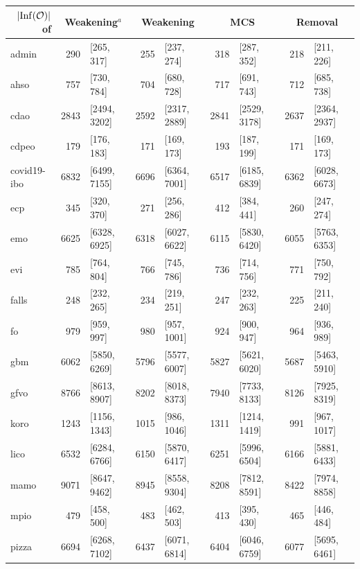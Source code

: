 \begin{table}[ht]
  \scriptsize
  \centering
  \begin{tabular}{|l|r@{ }lr@{ }lr@{ }lr@{ }l|}
    \cline{2-9}
    \multicolumn{1}{r|}{$|{\operatorname{Inf}}(\mathcal{O})|$ of} & \multicolumn{2}{c}{Weakening$^a$} & \multicolumn{2}{c}{Weakening} & \multicolumn{2}{c}{MCS} & \multicolumn{2}{c|}{Removal} \\
    \hline
    admin & 290 & [265, 317] & 255 & [237, 274] & 318 & [287, 352] & 218 & [211, 226] \\
    ahso & 757 & [730, 784] & 704 & [680, 728]& 717 & [691, 743] & 712 & [685, 738] \\
    cdao & 2843 & [2494, 3202] & 2592 & [2317, 2889] & 2841 & [2529, 3178] & 2637 & [2364, 2937] \\
    cdpeo & 179 & [176, 183] & 171 & [169, 173] & 193 & [187, 199] & 171 & [169, 173] \\
    covid19-ibo & 6832 & [6499, 7155] & 6696 & [6364, 7001] & 6517 & [6185, 6839] & 6362 & [6028, 6673] \\
    ecp & 345 & [320, 370] & 271 & [256, 286] & 412 & [384, 441] & 260 & [247, 274] \\
    emo & 6625 & [6328, 6925] & 6318 & [6027, 6622] & 6115 & [5830, 6420] & 6055 & [5763, 6353] \\
    evi & 785 & [764, 804] & 766 & [745, 786] & 736 & [714, 756] & 771 & [750, 792] \\
    falls & 248 & [232, 265] & 234 & [219, 251] & 247 & [232, 263] & 225 & [211, 240] \\
    fo & 979 & [959, 997] & 980 & [957, 1001] & 924 & [900, 947] & 964 & [936, 989] \\
    gbm & 6062 & [5850, 6269] & 5796 & [5577, 6007] & 5827 & [5621, 6020] & 5687 & [5463, 5910] \\
    gfvo & 8766 & [8613, 8907] & 8202 & [8018, 8373] & 7940 & [7733, 8133] & 8126 & [7925, 8319] \\
    koro & 1243 & [1156, 1343] & 1015 & [986, 1046] & 1311 & [1214, 1419] & 991 & [967, 1017] \\
    lico & 6532 & [6284, 6766] & 6150 & [5870, 6417] & 6251 & [5996, 6504] & 6166 & [5881, 6433] \\
    mamo & 9071 & [8647, 9462] & 8945 & [8558, 9304] & 8208 & [7812, 8591] & 8422 & [7974, 8858] \\
    mpio & 479 & [458, 500] & 483 & [462, 503] & 413 & [395, 430] & 465 & [446, 484] \\
    pizza & 6694 & [6268, 7102] & 6437 & [6071, 6814] & 6404 & [6046, 6759] & 6077 & [5695, 6461] \\

\end{tabular}
\end{table}
